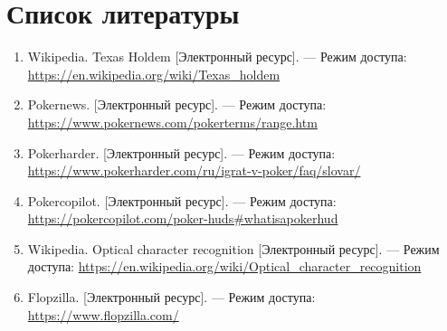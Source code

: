 \section*{Список литературы}

\begin{enumerate}
    \item Wikipedia. Texas Holdem [Электронный ресурс]. --- Режим доступа: \url{https://en.wikipedia.org/wiki/Texas_holdem}
    \item Pokernews. [Электронный ресурс]. --- Режим доступа: \url{https://www.pokernews.com/pokerterms/range.htm}
    \item Pokerharder. [Электронный ресурс]. --- Режим доступа: \url{https://www.pokerharder.com/ru/igrat-v-poker/faq/slovar/}
    \item Pokercopilot. [Электронный ресурс]. --- Режим доступа: \url{https://pokercopilot.com/poker-huds#whatisapokerhud}
    \item Wikipedia. Optical character recognition [Электронный ресурс]. --- Режим доступа: \url{https://en.wikipedia.org/wiki/Optical_character_recognition}
    \item Flopzilla. [Электронный ресурс]. --- Режим доступа: \url{https://www.flopzilla.com/}
\end{enumerate}

